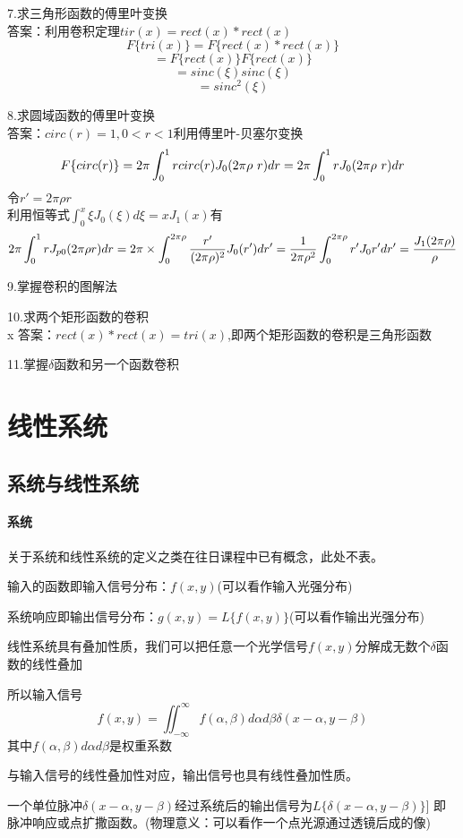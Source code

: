 \documentclass[UTF8]{ctexart}
\newcommand{\f}[2]{\frac{#1}{#2}}%
\begin{document}
7.求三角形函数的傅里叶变换\\
答案：利用卷积定理$tir(x)=rect(x)*rect(x)$
\[
F\{tri(x)\}=F\{rect(x)*rect(x)\}
    \]
\[=F\{rect(x)\}F\{rect(x)\}
    \]
\[=sinc(\xi)sinc(\xi)
    \]
\[=sinc^2(\xi)
    \]

8.求圆域函数的傅里叶变换\\
答案：$circ(r)=1,0<r<1$利用傅里叶-贝塞尔变换
\[ F\{circ(r)\}=2\pi\int_{0}^{1}rcirc(r)J_{0}(2\pi\rho\ r)dr
\\
=2\pi\int_{0}^{1}rJ_{0}(2\pi\rho\ r)dr
\]
令$r'=2\pi \rho r$\\
利用恒等式$\int_{0}^{x}\xi J_{0}(\xi)d\xi=xJ_{1}(x)$有
\[
    2\pi\int_{0}^{1}rJ_{p0}(2\pi\rho r)dr=2\pi\times\int_{0}^{2\pi\rho}\f{r'}{(2\pi\rho)^2}J_{0}(r')dr'
\\
=\f{1}{2\pi\rho^2}\int_{0}^{2\pi\rho}r'J_{0}r'dr'=\f{J_{1}(2\pi\rho)}{\rho}
\]

9.掌握卷积的图解法

10.求两个矩形函数的卷积\\x
答案：$rect(x)*rect(x)=tri(x)$,即两个矩形函数的卷积是三角形函数

11.掌握$\delta$函数和另一个函数卷积
\section{线性系统}
\subsection{系统与线性系统}
\paragraph{系统}
关于系统和线性系统的定义之类在往日课程中已有概念，此处不表。

输入的函数即输入信号分布：$f(x,y)$(可以看作输入光强分布)

系统响应即输出信号分布：$g(x,y)=L\{f(x,y)\}$(可以看作输出光强分布)


线性系统具有叠加性质，我们可以把任意一个光学信号$f(x,y)$分解成无数个$\delta$函数的线性叠加

所以输入信号
\[
    f(x,y)=\iint_{-\infty}^{\infty}f(\alpha,\beta)d\alpha d\beta\delta(x-\alpha,y-\beta)       
\]
其中$f(\alpha,\beta)d\alpha d\beta$是权重系数

与输入信号的线性叠加性对应，输出信号也具有线性叠加性质。

一个单位脉冲$\delta(x-\alpha,y-\beta)$经过系统后的输出信号为$L\{\delta(x-\alpha,y-\beta)\}]$
即脉冲响应或点扩撒函数。(物理意义：可以看作一个点光源通过透镜后成的像)
\end{document}
